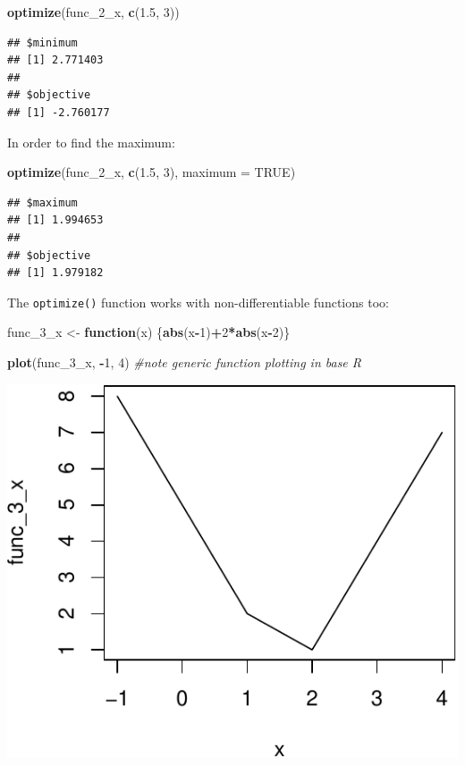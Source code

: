 \documentclass[11pt,]{article}
\newenvironment{Shaded}{\begin{snugshade}}{\end{snugshade}}
\newcommand{\KeywordTok}[1]{\textcolor[rgb]{0.13,0.29,0.53}{\textbf{#1}}}
\newcommand{\DataTypeTok}[1]{\textcolor[rgb]{0.13,0.29,0.53}{#1}}
\newcommand{\DecValTok}[1]{\textcolor[rgb]{0.00,0.00,0.81}{#1}}
\newcommand{\FloatTok}[1]{\textcolor[rgb]{0.00,0.00,0.81}{#1}}
\newcommand{\StringTok}[1]{\textcolor[rgb]{0.31,0.60,0.02}{#1}}
\newcommand{\CommentTok}[1]{\textcolor[rgb]{0.56,0.35,0.01}{\textit{#1}}}
\newcommand{\OtherTok}[1]{\textcolor[rgb]{0.56,0.35,0.01}{#1}}
\newcommand{\ControlFlowTok}[1]{\textcolor[rgb]{0.13,0.29,0.53}{\textbf{#1}}}
\newcommand{\OperatorTok}[1]{\textcolor[rgb]{0.81,0.36,0.00}{\textbf{#1}}}
\newcommand{\NormalTok}[1]{#1}
\begin{document}
\begin{Shaded}
\begin{Highlighting}[]
\KeywordTok{optimize}\NormalTok{(func_2_x, }\KeywordTok{c}\NormalTok{(}\FloatTok{1.5}\NormalTok{, }\DecValTok{3}\NormalTok{))}
\end{Highlighting}
\end{Shaded}

\begin{verbatim}
## $minimum
## [1] 2.771403
## 
## $objective
## [1] -2.760177
\end{verbatim}

In order to find the maximum:

\begin{Shaded}
\begin{Highlighting}[]
\KeywordTok{optimize}\NormalTok{(func_2_x, }\KeywordTok{c}\NormalTok{(}\FloatTok{1.5}\NormalTok{, }\DecValTok{3}\NormalTok{), }\DataTypeTok{maximum =} \OtherTok{TRUE}\NormalTok{)}
\end{Highlighting}
\end{Shaded}

\begin{verbatim}
## $maximum
## [1] 1.994653
## 
## $objective
## [1] 1.979182
\end{verbatim}

The \texttt{optimize()} function works with non-differentiable functions
too:

\begin{Shaded}
\begin{Highlighting}[]
\NormalTok{func_3_x <-}\StringTok{ }\ControlFlowTok{function}\NormalTok{(x) \{}\KeywordTok{abs}\NormalTok{(x}\OperatorTok{-}\DecValTok{1}\NormalTok{)}\OperatorTok{+}\DecValTok{2}\OperatorTok{*}\KeywordTok{abs}\NormalTok{(x}\OperatorTok{-}\DecValTok{2}\NormalTok{)\}}

\KeywordTok{plot}\NormalTok{(func_3_x, }\OperatorTok{-}\DecValTok{1}\NormalTok{, }\DecValTok{4}\NormalTok{) }\CommentTok{#note generic function plotting in base R}
\end{Highlighting}
\end{Shaded}

\includegraphics{Optimization_files/figure-latex/optimize_non_diff-1.pdf}
\end{document}

